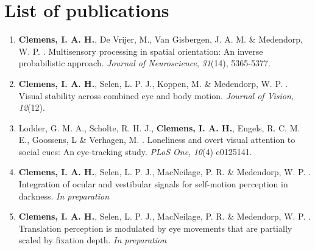 
\chapter*{List of publications}
{}

\begin{enumerate}

\item \textbf{Clemens, I. A. H.}, De Vrijer, M., Van Gisbergen, J. A. M. \& Medendorp, W. P.
\citeyear{clemens2011}. Multisensory processing in spatial orientation: An inverse probabilistic approach. \textit{Journal of Neuroscience}, \textit{31}(14), 5365-5377.

\item \textbf{Clemens, I. A. H.}, Selen, L. P. J., Koppen, M. \& Medendorp, W. P. \citeyear{clemens2012}. Visual stability across combined eye and body motion. \textit{Journal of Vision}, \textit{12}(12).

\item Lodder, G. M. A., Scholte, R. H. J., \textbf{Clemens, I. A. H.}, Engels, R. C. M. E., Goossens, L \& Verhagen, M. \citeyear{lodder2015}. Loneliness and overt visual attention to social cues: An eye-tracking study. \textit{PLoS One}, \textit{10}(4) e0125141.

\item \textbf{Clemens, I. A. H.}, Selen, L. P. J., MacNeilage, P. R. \& Medendorp, W. P. \citeyear{clemens2015a}. Integration of ocular and vestibular signals for self-motion perception in darkness. \textit{In preparation}

\item \textbf{Clemens, I. A. H.}, Selen, L. P. J., MacNeilage, P. R. \& Medendorp, W. P. \citeyear{clemens2015b}. Translation perception is modulated by eye movements that are partially scaled by fixation depth. \textit{In preparation}

\end{enumerate}
